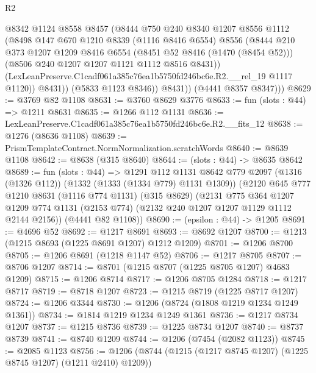 \begin{lexlean}{R2}
\begin{coremodule}
                @8342
                @1124
                @8558
                @8457
                (@8444
                  @750
                  @240
                  @8340
                  @1207
                  @8556
                  @1112
                  (@8498
                    @147
                    @670
                    @1210
                    @8339
                    (@1116 @8416 @6554)
                    @8556
                    (@8444
                      @210
                      @373
                      @1207
                      @1209
                      @8416
                      @6554
                      (@8451 @52 @8416 (@1470 (@8454 @52)))
                      (@8506 @240 @1207 @1207 @1121 @1112 @8516 @8431))
                    (LexLeanPreserve.C1cadf061a385c76ea1b5750fd246bc6e.R2.__rel_19 @1117 @1120))
                  @8431))
              (@5833 @1123 @8346))
            @8431))
        (@4441 @8357 @8347)))
@8629 := @3769 @82 @1108
@8631 := @3760 @8629 @3776
@8633 := fun (slots : @44) => @1211 @8631
@8635 := @1266 @112 @1131
@8636 := LexLeanPreserve.C1cadf061a385c76ea1b5750fd246bc6e.R2.__fits_12
@8638 := @1276 (@8636 @1108)
@8639 := PrismTemplateContract.NormNormalization.scratchWords
@8640 := @8639 @1108
@8642 := @8638 (@315 @8640)
@8644 := (slots : @44) -> @8635 @8642
@8689 := fun (slots : @44) =>
  @1291
    @112
    @1131
    @8642
    @779
    @2097
    (@1316 (@1326 @112))
    (@1332 (@1333 (@1334 @779) @1131 @1309))
    (@2120
      @645
      @777
      @1210
      @8631
      (@1116 @774 @1131)
      (@315 @8629)
      (@2131
        @775
        @364
        @1207
        @1209
        @774
        @1131
        (@2153 @774)
        (@2132 @240 @1207 @1207 @1129 @1112 @2144 @2156))
      (@4441 @82 @1108))
@8690 := (epsilon : @44) -> @1205
@8691 := @4696 @52
@8692 := @1217 @8691
@8693 := @8692 @1207
@8700 := @1213 (@1215 @8693 (@1225 @8691 @1207) @1212 @1209)
@8701 := @1206 @8700
@8705 := @1206 @8691 (@1218 @1147 @52)
@8706 := @1217 @8705
@8707 := @8706 @1207
@8714 := @8701 (@1215 @8707 (@1225 @8705 @1207) @4683 @1209)
@8715 := @1206 @8714
@8717 := @1206 @8705 @1284
@8718 := @1217 @8717
@8719 := @8718 @1207
@8723 := @1215 @8719 (@1225 @8717 @1207)
@8724 := @1206 @3344
@8730 := @1206 (@8724 (@1808 @1219 @1234 @1249 @1361))
@8734 := @1814 @1219 @1234 @1249 @1361
@8736 := @1217 @8734 @1207
@8737 := @1215 @8736
@8739 := @1225 @8734 @1207
@8740 := @8737 @8739
@8741 := @8740 @1209
@8744 := @1206 (@7454 (@2082 @1123))
@8745 := @2085 @1123
@8756 := @1206 (@8744 (@1215 (@1217 @8745 @1207) (@1225 @8745 @1207) (@1211 @2410) @1209))

\end{coremodule}
\end{lexlean}
